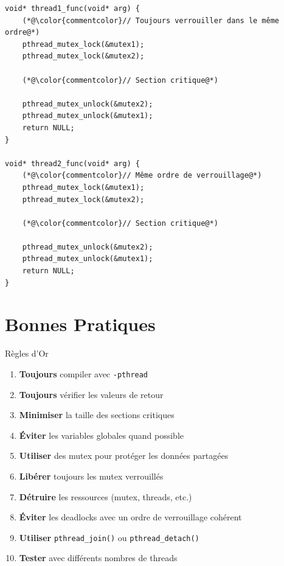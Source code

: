 \documentclass[11pt,a4paper]{article}
\begin{document}
\begin{lstlisting}[caption={Éviter le deadlock avec un ordre fixe}]
void* thread1_func(void* arg) {
    (*@\color{commentcolor}// Toujours verrouiller dans le même ordre@*)
    pthread_mutex_lock(&mutex1);
    pthread_mutex_lock(&mutex2);
    
    (*@\color{commentcolor}// Section critique@*)
    
    pthread_mutex_unlock(&mutex2);
    pthread_mutex_unlock(&mutex1);
    return NULL;
}

void* thread2_func(void* arg) {
    (*@\color{commentcolor}// Même ordre de verrouillage@*)
    pthread_mutex_lock(&mutex1);
    pthread_mutex_lock(&mutex2);
    
    (*@\color{commentcolor}// Section critique@*)
    
    pthread_mutex_unlock(&mutex2);
    pthread_mutex_unlock(&mutex1);
    return NULL;
}
\end{lstlisting}

\section{Bonnes Pratiques}

\begin{examplebox}{Règles d'Or}
\begin{enumerate}
    \item \textbf{Toujours} compiler avec \texttt{-pthread}
    \item \textbf{Toujours} vérifier les valeurs de retour
    \item \textbf{Minimiser} la taille des sections critiques
    \item \textbf{Éviter} les variables globales quand possible
    \item \textbf{Utiliser} des mutex pour protéger les données partagées
    \item \textbf{Libérer} toujours les mutex verrouillés
    \item \textbf{Détruire} les ressources (mutex, threads, etc.)
    \item \textbf{Éviter} les deadlocks avec un ordre de verrouillage cohérent
    \item \textbf{Utiliser} \texttt{pthread\_join()} ou \texttt{pthread\_detach()}
    \item \textbf{Tester} avec différents nombres de threads
\end{enumerate}
\end{examplebox}
\end{document}
